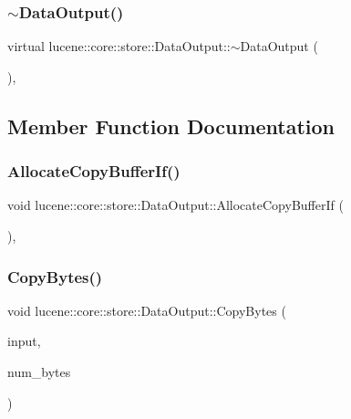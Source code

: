 \subsubsection{\texorpdfstring{$\sim$\+Data\+Output()}{~DataOutput()}}
{\footnotesize\ttfamily virtual lucene\+::core\+::store\+::\+Data\+Output\+::$\sim$\+Data\+Output (\begin{DoxyParamCaption}{ }\end{DoxyParamCaption})\hspace{0.3cm}{\ttfamily [inline]}, {\ttfamily [virtual]}}



\subsection{Member Function Documentation}
\mbox{\label{classlucene_1_1core_1_1store_1_1DataOutput_a10cb01ee76cad9e6250ef39571fd5bbc}} 
\subsubsection{\texorpdfstring{Allocate\+Copy\+Buffer\+If()}{AllocateCopyBufferIf()}}
{\footnotesize\ttfamily void lucene\+::core\+::store\+::\+Data\+Output\+::\+Allocate\+Copy\+Buffer\+If (\begin{DoxyParamCaption}{ }\end{DoxyParamCaption})\hspace{0.3cm}{\ttfamily [inline]}, {\ttfamily [private]}}

\mbox{\label{classlucene_1_1core_1_1store_1_1DataOutput_a7073c24bf5335a0910543bcc903b0bda}} 
\subsubsection{\texorpdfstring{Copy\+Bytes()}{CopyBytes()}}
{\footnotesize\ttfamily void lucene\+::core\+::store\+::\+Data\+Output\+::\+Copy\+Bytes (\begin{DoxyParamCaption}\item[{\mbox{\hyperlink{classlucene_1_1core_1_1store_1_1DataInput}{Data\+Input}} \&}]{input,  }\item[{\mbox{\hyperlink{ZlibCrc32_8h_a2c212835823e3c54a8ab6d95c652660e}{const}} uint64\+\_\+t}]{num\+\_\+bytes }\end{DoxyParamCaption})\hspace{0.3cm}{\ttfamily [inline]}}

